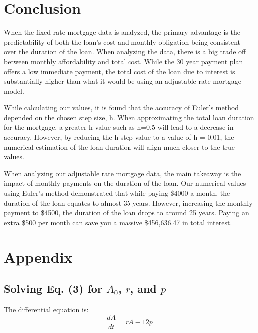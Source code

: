 \documentclass{article}
\numberwithin{figure}{section}
\begin{document}
\section{Conclusion}
When the fixed rate mortgage data is analyzed, the primary advantage is the predictability of both the loan's cost and monthly obligation being consistent over the duration of the loan. When analyzing the data, there is a big trade off between monthly affordability and total cost. While the 30 year payment plan offers a low immediate payment, the total cost of the loan due to interest is substantially higher than what it would be using an adjustable rate mortgage model. 

While calculating our values, it is found that the accuracy of Euler's method depended on the chosen step size, h. When approximating the total loan duration for the mortgage, a greater h value such as h=0.5 will lead to a decrease in accuracy. However, by reducing the h step value to a value of h = 0.01, the numerical estimation of the loan duration will align much closer to the true values. 

When analyzing our adjustable rate mortgage data, the main takeaway is the impact of monthly payments on the duration of the loan. Our numerical values using Euler's method demonstrated that while paying \$4000 a month, the duration of the loan equates to almost 35 years. However, increasing the monthly payment to \$4500, the duration of the loan drops to around 25 years. Paying an extra \$500 per month can save you a massive \$456,636.47 in total interest. 



\section{Appendix}
\appendix
\subsection{Solving Eq. (3) for $A_0$, $r$, and $p$}
    \label{app:der1}
    The differential equation is:
    \begin{equation*}
        \frac{dA}{dt} = rA - 12p
    \end{equation*}
    
\end{document}
